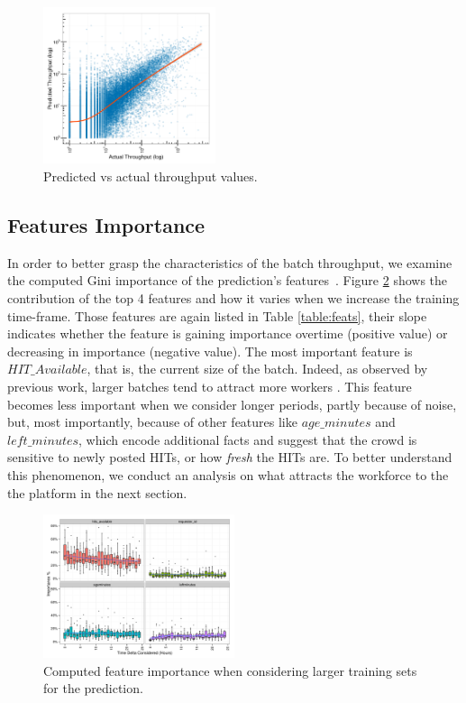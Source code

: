 \begin{figure}[t!]
	\centering
		\includegraphics[width=0.45\textwidth]{figures/predictions_3}
	\caption{Predicted vs actual throughput values.}
	\label{fig:pred}
\end{figure}

\subsection{Features Importance}
In order to better grasp the characteristics of the batch throughput, we examine the computed Gini importance of the prediction's features~\cite{breiman}.
Figure \ref{fig:importances} shows the  contribution of the top 4 features and how it varies  when we increase the training time-frame. Those features are again listed in Table \ref{table:feats}, their slope indicates whether the feature is gaining importance overtime (positive value) or decreasing in importance (negative value).
The most important feature is $HIT\_Available$, that is, the current size of the batch. Indeed, as observed by previous work, larger batches tend to attract more workers \cite{mturk,crowddb}. This feature becomes less important when we consider longer periods, partly because of noise, but, most importantly, because of other features like $age\_minutes$ and $left\_minutes$, which encode additional facts and suggest that the crowd is sensitive to newly posted HITs, or how \emph{fresh} the HITs are. To better understand this phenomenon, we conduct an analysis on what attracts the workforce to the the platform in the next section.

\begin{figure}[t!]
	\centering
		\includegraphics[width=0.5\textwidth]{figures/importances}
	\caption{Computed feature importance when considering larger training sets for the prediction.}
	\label{fig:importances}
\end{figure}

